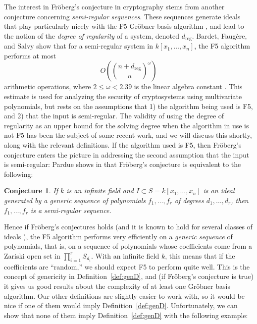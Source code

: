 \documentclass[11pt]{article}
\newcommand{\dreg}{d_{\text{reg}}}
\newtheorem{conjecture}{Conjecture}
\theoremstyle{definition}
\begin{document}
The interest in Fröberg's conjecture in cryptography stems from another conjecture concerning \emph{semi-regular sequences}. These sequences generate ideals that play particularly nicely with the F5 Gröbner basis algorithm \cite{faugere2002new}, and lead to the notion of the \emph{degree of regularity} of a system, denoted $\dreg$. Bardet, Faugère, and Salvy show that for a semi-regular system in $k[x_1, \dots, x_n]$, the F5 algorithm performs at most \[ O\left( \binom{n + \dreg}{n}^\omega \right) \] arithmetic operations, where $2 \leq \omega < 2.39$ is the linear algebra constant \cite{bardet2004complexity}. This estimate is used for analyzing the security of cryptosystems using multivariate polynomials, but rests on the assumptions that 1) the algorithm being used is F5, and 2) that the input is semi-regular. The validity of using the degree of regularity as an upper bound for the solving degree when the algorithm in use is not F5 has been the subject of some recent work, and we will discuss this shortly, along with the relevant definitions. If the algorithm used is F5, then Fröberg's conjecture enters the picture in addressing the second assumption that the input is semi-regular: Pardue shows in \cite{pardue2010generic} that Fröberg's conjecture is equivalent to the following:


\begin{conjecture}\label{Fr:equiv}
	If $k$ is an infinite field and $I \subset S = k[x_1, \dots, x_n]$ is an ideal generated by a generic sequence of polynomials $f_1, \dots, f_r$ of degrees $d_1, \dots, d_r$, then $f_1, \dots, f_r$ is a semi-regular sequence. 
\end{conjecture}


Hence if Fröberg's conjectures holds (and it is known to hold for several classes of ideals \cite{TRUNG201979}), the F5 algorithm performs very efficiently on a \emph{generic sequence} of polynomials, that is, on a sequence of polynomials whose coefficients come from a Zariski open set in $\prod_{i = 1}^r S_{d_i}$. With an infinite field $k$, this means that if the coefficients are ``random,'' we should expect F5 to perform quite well. This is the concept of genericity in Definition~\ref{def:genD}, and (if Fröberg's conjecture is true) it gives us good results about the complexity of at least one Gröbner basis algorithm. Our other definitions are slightly easier to work with, so it would be nice if one of them would imply Definition~\ref{def:genD}. Unfortunately, we can show that none of them imply Definition~\ref{def:genD} with the following example:
\end{document}
